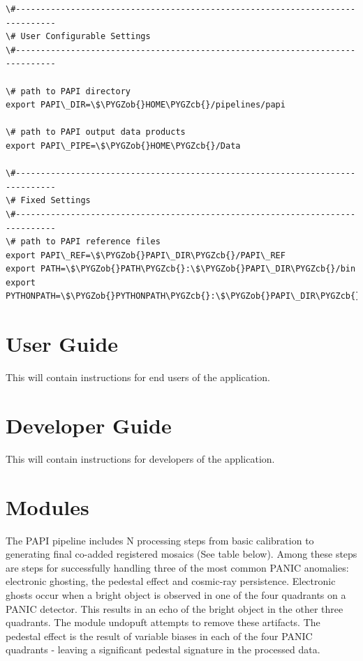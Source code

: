 \documentclass[letterpaper,10pt,english]{sphinxmanual}
\def\PYGZob{\char`\{}
\def\PYGZcb{\char`\}}
\begin{document}
\begin{Verbatim}[commandchars=\\\{\}]
\#------------------------------------------------------------------------------
\# User Configurable Settings
\#------------------------------------------------------------------------------

\# path to PAPI directory
export PAPI\_DIR=\$\PYGZob{}HOME\PYGZcb{}/pipelines/papi

\# path to PAPI output data products
export PAPI\_PIPE=\$\PYGZob{}HOME\PYGZcb{}/Data

\#------------------------------------------------------------------------------
\# Fixed Settings
\#------------------------------------------------------------------------------
\# path to PAPI reference files
export PAPI\_REF=\$\PYGZob{}PAPI\_DIR\PYGZcb{}/PAPI\_REF
export PATH=\$\PYGZob{}PATH\PYGZcb{}:\$\PYGZob{}PAPI\_DIR\PYGZcb{}/bin
export PYTHONPATH=\$\PYGZob{}PYTHONPATH\PYGZcb{}:\$\PYGZob{}PAPI\_DIR\PYGZcb{}/lib
\end{Verbatim}


\chapter{User Guide}
\label{user_guide:user-guide}\label{user_guide::doc}
This will contain instructions for end users of the application.


\chapter{Developer Guide}
\label{developer_guide::doc}\label{developer_guide:developer-guide}
This will contain instructions for developers of the application.


\chapter{Modules}
\label{modules:modules}\label{modules::doc}
The PAPI pipeline includes N processing steps from basic calibration
to generating final co-added registered mosaics (See table below). Among these
steps are steps for successfully handling three of the most common PANIC
anomalies: electronic ghosting, the pedestal effect and cosmic-ray persistence.
Electronic ghosts occur when a bright object is observed in one of the four
quadrants on a PANIC detector. This results in an echo of the bright object
in the other three quadrants. The module undopuft attempts to remove these
artifacts. The pedestal effect is the result of variable biases in each of the four
PANIC quadrants - leaving a significant pedestal signature in the processed
data.
\end{document}
